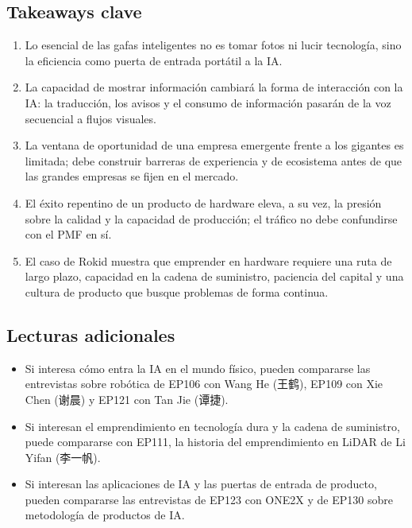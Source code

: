 \subsection{Takeaways clave}

\begin{enumerate}
\item Lo esencial de las gafas inteligentes no es tomar fotos ni lucir tecnología, sino la eficiencia como puerta de entrada portátil a la IA.
\item La capacidad de mostrar información cambiará la forma de interacción con la IA: la traducción, los avisos y el consumo de información pasarán de la voz secuencial a flujos visuales.
\item La ventana de oportunidad de una empresa emergente frente a los gigantes es limitada; debe construir barreras de experiencia y de ecosistema antes de que las grandes empresas se fijen en el mercado.
\item El éxito repentino de un producto de hardware eleva, a su vez, la presión sobre la calidad y la capacidad de producción; el tráfico no debe confundirse con el PMF en sí.
\item El caso de Rokid muestra que emprender en hardware requiere una ruta de largo plazo, capacidad en la cadena de suministro, paciencia del capital y una cultura de producto que busque problemas de forma continua.
\end{enumerate}

\subsection{Lecturas adicionales}

\begin{itemize}
\item Si interesa cómo entra la IA en el mundo físico, pueden compararse las entrevistas sobre robótica de EP106 con Wang He (王鹤), EP109 con Xie Chen (谢晨) y EP121 con Tan Jie (谭捷).
\item Si interesan el emprendimiento en tecnología dura y la cadena de suministro, puede compararse con EP111, la historia del emprendimiento en LiDAR de Li Yifan (李一帆).
\item Si interesan las aplicaciones de IA y las puertas de entrada de producto, pueden compararse las entrevistas de EP123 con ONE2X y de EP130 sobre metodología de productos de IA.
\end{itemize}


